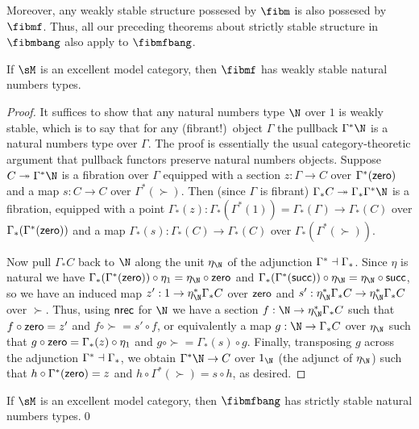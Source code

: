 Moreover, any weakly stable structure possesed by $\fibm$ is also possesed by $\fibmf$.
Thus, all our preceding theorems about strictly stable structure in $\fibmbang$ also apply to $\fibmfbang$.

\begin{thm}\label{thm:nat-stable}
  If $\sM$ is an excellent model category, then $\fibmf$ has weakly stable natural numbers types.
\end{thm}
\begin{proof}
  It suffices to show that any natural numbers type $\N$ over $1$ is weakly stable, which is to say that for any (fibrant!)\ object $\Gamma$ the pullback $\Gamma^* \N$ is a natural numbers type over $\Gamma$.
  The proof is essentially the usual category-theoretic argument that pullback functors preserve natural numbers objects.
  Suppose $C\fib \Gamma^* \N$ is a fibration over $\Gamma$ equipped with a section $z:\Gamma\to C$ over $\Gamma^*(\mathsf{zero})$ and a map $s:C\to C$ over $\Gamma^*(\succ)$.
  Then (since $\Gamma$ is fibrant) $\Gamma_* C \fib \Gamma_* \Gamma^* \N$ is a fibration, equipped with a point $\Gamma_*(z) : \Gamma_*(\Gamma^*(1)) = \Gamma_*(\Gamma) \to \Gamma_*(C)$ over $\Gamma_*(\Gamma^*(\mathsf{zero}))$ and a map $\Gamma_*(s):\Gamma_*(C)\to\Gamma_*(C)$ over $\Gamma_*(\Gamma^*(\succ))$.

  Now pull $\Gamma_* C$ back to $\N$ along the unit $\eta_\N$ of the adjunction $\Gamma^* \dashv \Gamma_*$.
  Since $\eta$ is natural we have $\Gamma_*(\Gamma^*(\zero)) \circ \eta_1 = \eta_\N \circ \zero$ and $\Gamma_*(\Gamma^*(\succ)) \circ \eta_\N = \eta_\N \circ \succ$, so we have an induced map $z' : 1 \to \eta_\N^*\Gamma_*C$ over $\mathsf{zero}$ and $s':\eta_\N^*\Gamma_*C \to \eta_\N^*\Gamma_*C$ over $\succ$.
  Thus, using $\mathsf{nrec}$ for $\N$ we have a section $f:\N\to \eta_\N^*\Gamma_* C$ such that $f \circ \mathsf{zero} = z'$ and $f\circ \succ = s' \circ f$, or equivalently a map $g:\N \to \Gamma_*C$ over $\eta_\N$ such that $g\circ \mathsf{zero} = \Gamma_*(z) \circ \eta_1$ and $g\circ \succ = \Gamma_*(s) \circ g$.
  Finally, transposing $g$ across the adjunction $\Gamma^* \dashv \Gamma_*$, we obtain $\Gamma^* \N \to C$ over $1_\N$ (the adjunct of $\eta_\N$) such that $h\circ \Gamma^*(\mathsf{zero}) = z$ and $h\circ \Gamma^*(\succ) = s\circ h$, as desired.
\end{proof}

\begin{cor}
  If $\sM$ is an excellent model category, then $\fibmfbang$ has strictly stable natural numbers types.\qed
\end{cor}


